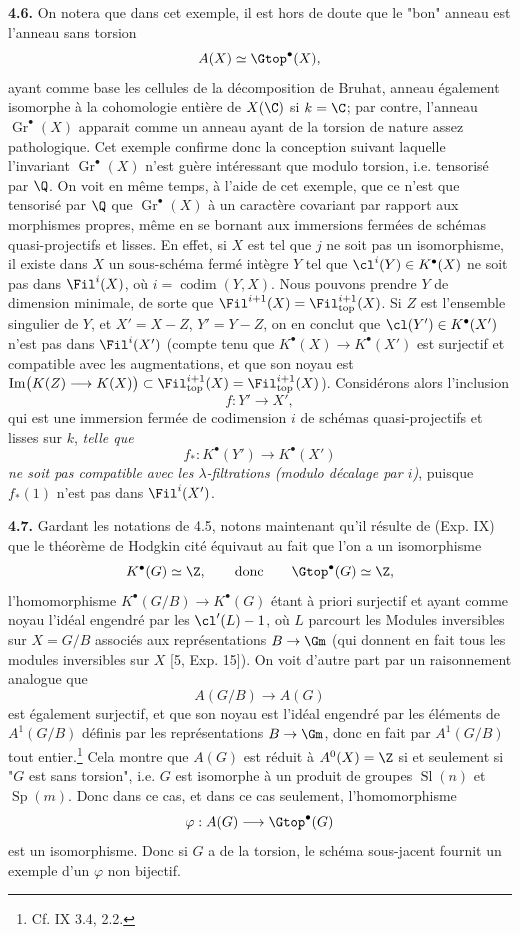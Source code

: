\textbf{4.6.} On notera que dans cet exemple, il est hors de doute que le "bon" anneau est l'anneau sans torsion
\[
 A(X)\simeq\Gtop^\bullet(X),
\]
ayant comme base les cellules de la décomposition de Bruhat, anneau également isomorphe à la cohomologie entière de $X(\C)$ si $k=\C$; par contre, l'anneau $\operatorname{Gr}^\bullet(X)$ apparait comme un anneau ayant de la torsion de nature assez pathologique. Cet exemple confirme donc la conception suivant laquelle l'invariant $\operatorname{Gr}^\bullet(X)$ n'est guère
intéressant que modulo torsion, i.e. tensorisé par $\Q$. On voit en même temps, à l'aide de cet exemple, que ce n'est que tensorisé par $\Q$ que $\operatorname{Gr}^\bullet(X)$ à un caractère covariant par rapport aux morphismes propres, même en se bornant aux immersions fermées de schémas quasi-projectifs et lisses. En effet, si $X$ est tel que $j$ ne soit pas un isomorphisme, il existe dans $X$ un sous-schéma fermé intègre $Y$ tel que $\cl^i(Y)\in K^\bullet(X)$ ne soit pas dans $\Fil^i(X)$, où $i=\operatorname{codim}(Y,X)$. Nous pouvons prendre $Y$ de dimension minimale, de sorte que $\Fil^{i+1}(X)=\Fil_{\mathrm{top}}^{i+1}(X)$. Si $Z$ est l'ensemble singulier de $Y$, et $X'=X-Z$, $Y'=Y-Z$, on en conclut que $\cl(Y')\in K^\bullet(X')$ n'est pas dans $\Fil^i(X')$ (compte tenu que $K^\bullet(X)\to K^\bullet(X')$ est surjectif et compatible avec les augmentations, et que son noyau est $\operatorname{Im}\bigl(K(Z)\longrightarrow K(X)\bigr)\subset\Fil_{\mathrm{top}}^{i+1}(X)=\Fil_{\mathrm{top}}^{i+1}(X)$). Considérons alors l'inclusion
\[
 f:Y'\longrightarrow X',
\]
qui est une immersion fermée de codimension $i$ de schémas quasi-projectifs et lisses sur $k$, \emph{telle que}
\[
 f_*:K^\bullet(Y')\longrightarrow K^\bullet(X')
\]
\emph{ne soit pas compatible avec les $\lambda$-filtrations (modulo décalage par $i$)}, puisque $f_*(1)$ n'est pas dans $\Fil^i(X')$.

\textbf{4.7.} Gardant les notations de 4.5, notons maintenant qu'il résulte de (Exp. IX) que le théorème de Hodgkin cité équivaut au fait que l'on a un isomorphisme
\[
 K^\bullet(G)\simeq\Z,\qquad\text{donc}\qquad \Gtop^\bullet(G)\simeq\Z,
\]
l'homomorphisme $K^\bullet(G/B)\to K^\bullet(G)$ étant à priori surjectif et ayant comme noyau l'idéal engendré par les $\cl'(L)-1$, où $L$ parcourt les Modules inversibles sur $X=G/B$ associés aux représentations $B\to\Gm$ (qui donnent en fait tous les modules inversibles sur $X$ [5, Exp. 15]). On voit d'autre part par un raisonnement analogue que
\[
 A(G/B)\longrightarrow A(G)
\]
est également surjectif, et que son noyau est l'idéal engendré par les éléments de $A^1(G/B)$ définis par les représentations $B\to\Gm$, donc en fait par $A^1(G/B)$ tout entier.\footnote{Cf. IX 3.4, 2.2.} Cela montre que $A(G)$ est réduit à $A^0(X)=\Z$ si et
seulement si "$G$ est sans torsion", i.e. $G$ est isomorphe à un produit de groupes $\operatorname{Sl}(n)$ et $\operatorname{Sp}(m)$. Donc dans ce cas, et dans ce cas seulement, l'homomorphisme
\[
 \varphi:A(G)\longrightarrow\Gtop^\bullet(G)
\]
est un isomorphisme. Donc si $G$ a de la torsion, le schéma sous-jacent fournit un exemple d'un $\varphi$ non bijectif.

